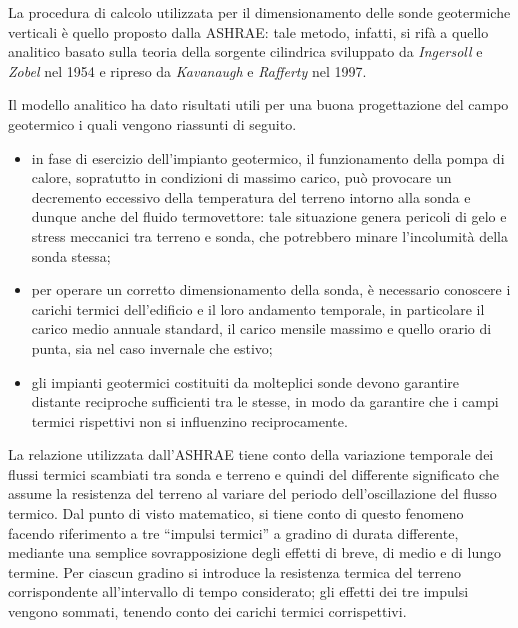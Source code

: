 La procedura di calcolo utilizzata per il dimensionamento delle sonde geotermiche verticali è quello proposto dalla ASHRAE: tale metodo, infatti, si rifà a quello analitico basato sulla teoria della sorgente cilindrica sviluppato da \emph{Ingersoll} e \emph{Zobel} nel 1954 e ripreso da \emph{Kavanaugh} e \emph{Rafferty} nel 1997.

Il modello analitico ha dato risultati utili per una buona progettazione del campo geotermico i quali vengono riassunti di seguito.
\begin{itemize}
	\item in fase di esercizio dell'impianto geotermico, il funzionamento della pompa di calore, sopratutto in condizioni di massimo carico, può provocare un decremento eccessivo della temperatura del terreno intorno alla sonda e dunque anche del fluido termovettore: tale situazione genera pericoli di gelo e stress meccanici tra terreno e sonda, che potrebbero minare l'incolumità della sonda stessa;
	\item per operare un corretto dimensionamento della sonda, è necessario conoscere i carichi termici dell'edificio e il loro andamento temporale, in particolare il carico medio annuale standard, il carico mensile massimo e quello orario di punta, sia nel caso invernale che estivo;
	\item gli impianti geotermici costituiti da molteplici sonde devono garantire distante reciproche sufficienti tra le stesse, in modo da garantire che i campi termici rispettivi non si influenzino reciprocamente. 
\end{itemize}
La relazione utilizzata dall'ASHRAE tiene conto della variazione temporale dei flussi termici scambiati tra sonda e terreno e quindi del differente significato che assume la resistenza del terreno al variare del periodo dell'oscillazione del flusso termico. Dal punto di visto matematico, si tiene conto di questo fenomeno facendo riferimento a tre ``impulsi termici'' a gradino di durata differente, mediante una semplice sovrapposizione degli effetti di breve, di medio e di lungo termine. Per ciascun gradino si introduce la resistenza termica del terreno corrispondente all'intervallo di tempo considerato; gli effetti dei tre impulsi vengono sommati, tenendo conto dei carichi termici corrispettivi.


